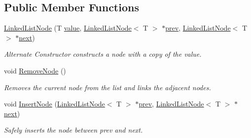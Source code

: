 \subsection*{Public Member Functions}
\begin{DoxyCompactItemize}
\item 
\hyperlink{classutil_1_1LinkedListNode_a7bb8008f6d5a04ed6229c7f3d241d442}{Linked\+List\+Node} (T \hyperlink{classutil_1_1LinkedListNode_a190922a539e799d955b40673f8aa79bc}{value}, \hyperlink{classutil_1_1LinkedListNode}{Linked\+List\+Node}$<$ T $>$ $\ast$\hyperlink{classutil_1_1LinkedListNode_acdb98170eeeeb05c187a8aff5f613b20}{prev}, \hyperlink{classutil_1_1LinkedListNode}{Linked\+List\+Node}$<$ T $>$ $\ast$\hyperlink{classutil_1_1LinkedListNode_a293bf69c48417a2487d2c479ab74f4d0}{next})
\begin{DoxyCompactList}\small\item\em Alternate Constructor constructs a node with a copy of the value. \end{DoxyCompactList}\item 
\mbox{\label{classutil_1_1LinkedListNode_a814c4dcba5bdfa585ca344e70cb70883}} 
void \hyperlink{classutil_1_1LinkedListNode_a814c4dcba5bdfa585ca344e70cb70883}{Remove\+Node} ()
\begin{DoxyCompactList}\small\item\em Removes the current node from the list and links the adjacent nodes. \end{DoxyCompactList}\item 
void \hyperlink{classutil_1_1LinkedListNode_a51ad4d3472a7d5808c45f480e83c4a32}{Insert\+Node} (\hyperlink{classutil_1_1LinkedListNode}{Linked\+List\+Node}$<$ T $>$ $\ast$\hyperlink{classutil_1_1LinkedListNode_acdb98170eeeeb05c187a8aff5f613b20}{prev}, \hyperlink{classutil_1_1LinkedListNode}{Linked\+List\+Node}$<$ T $>$ $\ast$\hyperlink{classutil_1_1LinkedListNode_a293bf69c48417a2487d2c479ab74f4d0}{next})
\begin{DoxyCompactList}\small\item\em Safely inserts the node between prev and next. \end{DoxyCompactList}\end{DoxyCompactItemize}
